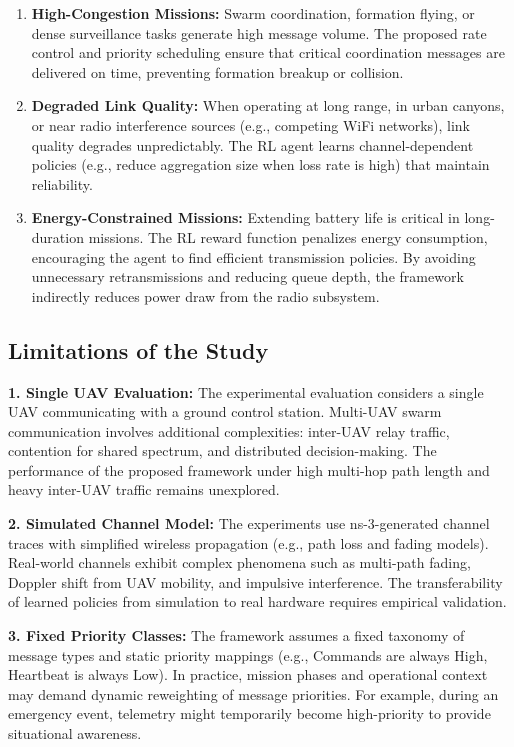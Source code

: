 \documentclass[pdflatex,sn-mathphys-num]{sn-jnl}%
\theoremstyle{thmstyleone}%
\theoremstyle{thmstyletwo}%
\theoremstyle{thmstylethree}%
\begin{document}
\begin{enumerate}
    \item \textbf{High-Congestion Missions:} Swarm coordination, formation flying, or dense surveillance tasks generate high message volume. The proposed rate control and priority scheduling ensure that critical coordination messages are delivered on time, preventing formation breakup or collision.
    
    \item \textbf{Degraded Link Quality:} When operating at long range, in urban canyons, or near radio interference sources (e.g., competing WiFi networks), link quality degrades unpredictably. The RL agent learns channel-dependent policies (e.g., reduce aggregation size when loss rate is high) that maintain reliability.
    
    \item \textbf{Energy-Constrained Missions:} Extending battery life is critical in long-duration missions. The RL reward function penalizes energy consumption, encouraging the agent to find efficient transmission policies. By avoiding unnecessary retransmissions and reducing queue depth, the framework indirectly reduces power draw from the radio subsystem.
\end{enumerate}

\subsection{ Limitations of the Study }

\textbf{1. Single UAV Evaluation:} The experimental evaluation considers a single UAV communicating with a ground control station. Multi-UAV swarm communication involves additional complexities: inter-UAV relay traffic, contention for shared spectrum, and distributed decision-making. The performance of the proposed framework under high multi-hop path length and heavy inter-UAV traffic remains unexplored.

\textbf{2. Simulated Channel Model:} The experiments use ns-3-generated channel traces with simplified wireless propagation (e.g., path loss and fading models). Real-world channels exhibit complex phenomena such as multi-path fading, Doppler shift from UAV mobility, and impulsive interference. The transferability of learned policies from simulation to real hardware requires empirical validation.

\textbf{3. Fixed Priority Classes:} The framework assumes a fixed taxonomy of message types and static priority mappings (e.g., Commands are always High, Heartbeat is always Low). In practice, mission phases and operational context may demand dynamic reweighting of message priorities. For example, during an emergency event, telemetry might temporarily become high-priority to provide situational awareness.
\end{document}
